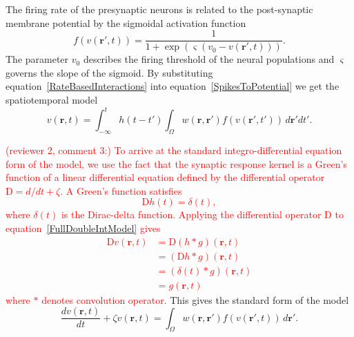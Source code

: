 \documentclass[review,authoryear,3p]{elsarticle}
\newcommand{\dean}[1]{\textcolor{red}{#1}}
\begin{document}
The firing rate of the presynaptic neurons is related to the post-synaptic membrane potential by the sigmoidal activation function 
\begin{equation}
	\label{ActivationFunction} f\left( v\left( \mathbf{r}', t \right) \right) = \frac{1}{1 + \exp \left( \varsigma \left( v_0 - v\left(\mathbf{r}',t\right) \right) \right)}. 
\end{equation}
The parameter $v_0$ describes the firing threshold of the neural populations and $\varsigma$ governs the slope of the sigmoid. By substituting equation~\ref{RateBasedInteractions} into equation~\ref{SpikesToPotential} we get the spatiotemporal model 
\begin{equation}
	\label{FullDoubleIntModel} v\left(\mathbf{r},t\right) =
	\int_{-\infty}^t 
	h\left(t - t'\right) \int_\Omega
	w\left(\mathbf{r},\mathbf{r}'\right) 
	f\left( v\left( \mathbf{r}',t' \right)\right)
	\, d\mathbf{r}'dt'.
\end{equation}

\dean{(reviewer 2, comment 3:) To arrive at the standard integro-differential equation form of the model, we use the fact that the synaptic response kernel is a Green's function of a linear differential equation defined by the differential operator $\textrm{D}=d/dt + \zeta$. A Green's function satisfies
\begin{equation}
	\label{GreensFuncDef} \textrm{D}h\left( t \right) = \delta \left( t \right), 
\end{equation} 
where $\delta(t)$ is the Dirac-delta function. Applying the differential operator $\textrm{D}$ to equation~\ref{FullDoubleIntModel} gives
\begin{align}
 \textrm{D}v\left(\mathbf r,t\right)&= \textrm{D}\left(h\ast g\right)\left(\mathbf r,t\right)\\
&=\left(\textrm{D}h\ast g\right)\left(\mathbf r,t\right)\\
&=\left(\delta \left(t\right)\ast g\right)\left(\mathbf r,t\right)\\
&=g\left(\mathbf r,t\right)
\end{align}
where $\ast$ denotes convolution operator.} This gives the standard form of the model
\begin{equation}
	\label{FinalFormContinuous} 
	\frac{dv\left( \mathbf{r},t \right)}{dt} + \zeta v\left( \mathbf{r},t \right) = \int_\Omega {w\left( \mathbf{r},\mathbf{r}' \right)f\left( {v\left( \mathbf{r}',t \right)} \right)\, d\mathbf{r}'}. 
\end{equation}
\end{document}
